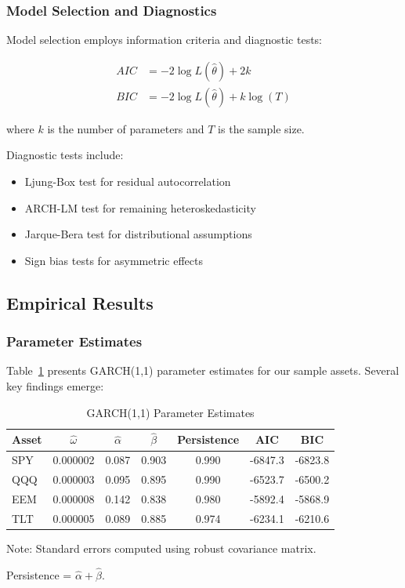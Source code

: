 \documentclass[12pt,a4paper]{article}
\begin{document}
\subsubsection{Model Selection and Diagnostics}

Model selection employs information criteria and diagnostic tests:

\begin{align}
AIC &= -2\log L(\hat{\theta}) + 2k \\
BIC &= -2\log L(\hat{\theta}) + k\log(T)
\end{align}

where $k$ is the number of parameters and $T$ is the sample size.

Diagnostic tests include:
\begin{itemize}
    \item Ljung-Box test for residual autocorrelation
    \item ARCH-LM test for remaining heteroskedasticity
    \item Jarque-Bera test for distributional assumptions
    \item Sign bias tests for asymmetric effects
\end{itemize}

\subsection{Empirical Results}

\subsubsection{Parameter Estimates}

Table~\ref{tab:garch_results} presents GARCH(1,1) parameter estimates for our sample assets. Several key findings emerge:

\begin{table}[H]
\centering
\begin{threeparttable}
\caption{GARCH(1,1) Parameter Estimates}
\label{tab:garch_results}
\begin{tabular}{@{}lcccccc@{}}
\toprule
\textbf{Asset} & $\hat{\omega}$ & $\hat{\alpha}$ & $\hat{\beta}$ & \textbf{Persistence} & \textbf{AIC} & \textbf{BIC} \\
\midrule
SPY & 0.000002 & 0.087 & 0.903 & 0.990 & -6847.3 & -6823.8 \\
QQQ & 0.000003 & 0.095 & 0.895 & 0.990 & -6523.7 & -6500.2 \\
EEM & 0.000008 & 0.142 & 0.838 & 0.980 & -5892.4 & -5868.9 \\
TLT & 0.000005 & 0.089 & 0.885 & 0.974 & -6234.1 & -6210.6 \\
\bottomrule
\end{tabular}
\begin{tablenotes}
\item Note: Standard errors computed using robust covariance matrix.
\item Persistence = $\hat{\alpha} + \hat{\beta}$.
\end{tablenotes}
\end{threeparttable}
\end{table}
\end{document}
